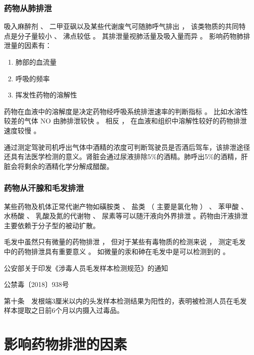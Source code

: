 \documentclass[dvipsnames, svgnames, x11names]{beamer}
\begin{document}
\begin{frame}
    \frametitle{药物从肺排泄}
    吸入麻醉剂 、 二甲亚砜以及某些代谢废气可随肺呼气排出 ， 该类物质的共同特点是分子量较小 、 沸点较低 。 其排泄量视肺活量及吸入量而异 。 影响药物肺排泄量的因素有：
    \begin{enumerate}
      \item 肺部的血流量
      \item 呼吸的频率
      \item 挥发性药物的溶解性
    \end{enumerate}
    药物在血液中的溶解度是决定药物经呼吸系统排泄速率的判断指标 。 比如水溶性较差的气体 NO 由肺排泄较快 。 相反 ， 在血液和组织中溶解性较好的药物排泄速度较慢 。
    \begin{blankblock}{}
         通过测定驾驶司机呼出气体中酒精的浓度可判断驾驶员是否酒后驾车，该排泄途径还具有法医学检测的意义。肾脏会通过尿液排除5\%的酒精。肺呼出5\%的酒精，肝脏会将剩余的酒精化学分解成醋酸。
    \end{blankblock}
\end{frame}


\begin{frame}
    \frametitle{药物从汗腺和毛发排泄}
    某些药物及机体正常代谢产物如磺胺类 、 盐类 （ 主要是氯化物 ） 、 苯甲酸 、 水杨酸 、 乳酸及氮的代谢物 、 尿素等可以随汗液向外界排泄 。药物由汗液排泄主要依赖于分子型的被动扩散。
    
    \bigskip
    毛发中虽然只有微量的药物排泄 ， 但对于某些有毒物质的检测来说 ， 测定毛发中的药物排泄具有重要意义 。 如微量的汞和砷在毛发中是可以检测到的 。
    \begin{blankblock}{}
      \begin{center}
        公安部关于印发《涉毒人员毛发样本检测规范》的通知

      公禁毒〔2018〕938号
      \end{center}      
      第十条　发根端3厘米以内的头发样本检测结果为阳性的，表明被检测人员在毛发样本提取之日前6个月以内摄入过毒品。
    \end{blankblock}
\end{frame}


\section{影响药物排泄的因素}
\end{document}
